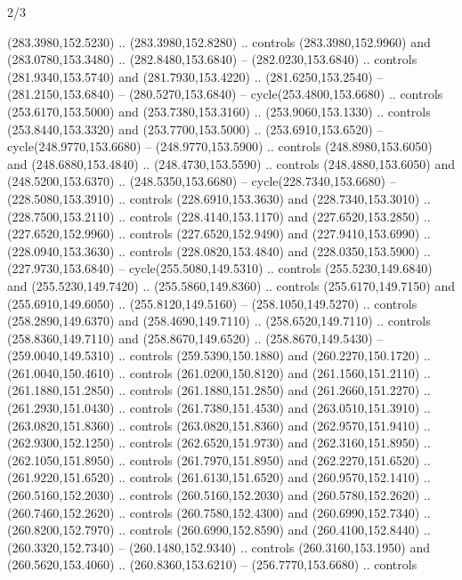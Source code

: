 \begin{flagdescription}{2/3}
\begin{scope}[xshift=0.5\flaglength,yshift=0.5\flagwidth,scale=\flagwidth/259.2]
\begin{scope}[y=0.8pt, x=0.8pt, yscale=-1,shift={(-243,-162)}]
      (283.3980,152.5230) .. (283.3980,152.8280) .. controls (283.3980,152.9960) and
      (283.0780,153.3480) .. (282.8480,153.6840) -- (282.0230,153.6840) .. controls
      (281.9340,153.5740) and (281.7930,153.4220) .. (281.6250,153.2540) --
      (281.2150,153.6840) -- (280.5270,153.6840) -- cycle(253.4800,153.6680) ..
      controls (253.6170,153.5000) and (253.7380,153.3160) .. (253.9060,153.1330) ..
      controls (253.8440,153.3320) and (253.7700,153.5000) .. (253.6910,153.6520) --
      cycle(248.9770,153.6680) -- (248.9770,153.5900) .. controls
      (248.8980,153.6050) and (248.6880,153.4840) .. (248.4730,153.5590) .. controls
      (248.4880,153.6050) and (248.5200,153.6370) .. (248.5350,153.6680) --
      cycle(228.7340,153.6680) -- (228.5080,153.3910) .. controls
      (228.6910,153.3630) and (228.7340,153.3010) .. (228.7500,153.2110) .. controls
      (228.4140,153.1170) and (227.6520,153.2850) .. (227.6520,152.9960) .. controls
      (227.6520,152.9490) and (227.9410,153.6990) .. (228.0940,153.3630) .. controls
      (228.0820,153.4840) and (228.0350,153.5900) .. (227.9730,153.6840) --
      cycle(255.5080,149.5310) .. controls (255.5230,149.6840) and
      (255.5230,149.7420) .. (255.5860,149.8360) .. controls (255.6170,149.7150) and
      (255.6910,149.6050) .. (255.8120,149.5160) -- (258.1050,149.5270) .. controls
      (258.2890,149.6370) and (258.4690,149.7110) .. (258.6520,149.7110) .. controls
      (258.8360,149.7110) and (258.8670,149.6520) .. (258.8670,149.5430) --
      (259.0040,149.5310) .. controls (259.5390,150.1880) and (260.2270,150.1720) ..
      (261.0040,150.4610) .. controls (261.0200,150.8120) and (261.1560,151.2110) ..
      (261.1880,151.2850) .. controls (261.1880,151.2850) and (261.2660,151.2270) ..
      (261.2930,151.0430) .. controls (261.7380,151.4530) and (263.0510,151.3910) ..
      (263.0820,151.8360) .. controls (263.0820,151.8360) and (262.9570,151.9410) ..
      (262.9300,152.1250) .. controls (262.6520,151.9730) and (262.3160,151.8950) ..
      (262.1050,151.8950) .. controls (261.7970,151.8950) and (262.2270,151.6520) ..
      (261.9220,151.6520) .. controls (261.6130,151.6520) and (260.9570,152.1410) ..
      (260.5160,152.2030) .. controls (260.5160,152.2030) and (260.5780,152.2620) ..
      (260.7460,152.2620) .. controls (260.7580,152.4300) and (260.6990,152.7340) ..
      (260.8200,152.7970) .. controls (260.6990,152.8590) and (260.4100,152.8440) ..
      (260.3320,152.7340) -- (260.1480,152.9340) .. controls (260.3160,153.1950) and
      (260.5620,153.4060) .. (260.8360,153.6210) -- (256.7770,153.6680) .. controls

\end{scope}
\end{scope}
\end{flagdescription}

